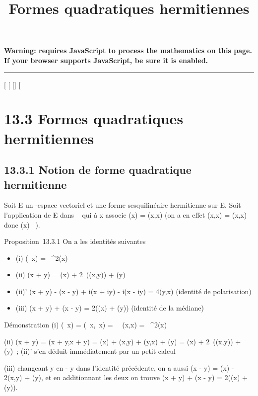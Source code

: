 \documentclass[]{article}
\title{Formes quadratiques hermitiennes}
\author{}
\date{}
\begin{document}
\maketitle

\textbf{Warning: 
requires JavaScript to process the mathematics on this page.\\ If your
browser supports JavaScript, be sure it is enabled.}

\begin{center}\rule{3in}{0.4pt}\end{center}

[
[
[]
[

\section{13.3 Formes quadratiques hermitiennes}

\subsection{13.3.1 Notion de forme quadratique hermitienne}

Soit E un -espace vectoriel et \phi une forme sesquilinéaire hermitienne
sur E. Soit \Phi l'application de E dans ~ qui à x associe \Phi(x) = \phi(x,x)
(on a en effet \phi(x,x) = \overline\phi(x,x) donc \Phi(x) \in
{}~).

Proposition~13.3.1 On a les identités suivantes

\begin{itemize}
\itemsep1pt\parskip0pt
\item
  (i) \Phi(\lambda~x) = \lambda~^2\Phi(x)
\item
  (ii) \Phi(x + y) = \Phi(x) +
  2\mathrmRe~(\phi(x,y)) + \Phi(y)
\item
  (ii)' \Phi(x + y) - \Phi(x - y) + i\Phi(x + iy) - i\Phi(x - iy) = 4\phi(y,x)
  (identité de polarisation)
\item
  (iii) \Phi(x + y) + \Phi(x - y) = 2(\Phi(x) + \Phi(y)) (identité de la médiane)
\end{itemize}

Démonstration (i) \Phi(\lambda~x) = \phi(\lambda~x,\lambda~x) =
\lambda~\overline\lambda~\phi(x,x) =
\lambda~^2\Phi(x)

(ii) \Phi(x + y) = \phi(x + y,x + y) = \Phi(x) + \phi(x,y) + \phi(y,x) + \Phi(y) = \Phi(x) +
2\mathrmRe~(\phi(x,y)) + \Phi(y)~;
(ii)' s'en déduit immédiatement par un petit calcul

(iii) changeant y en - y dans l'identité précédente, on a aussi \Phi(x - y)
= \Phi(x) - 2\phi(x,y) + \Phi(y), et en additionnant les deux on trouve \Phi(x + y)
+ \Phi(x - y) = 2(\Phi(x) + \Phi(y)).
\end{document}
